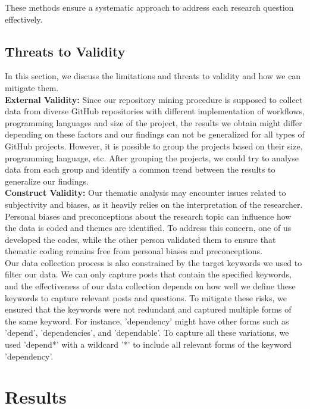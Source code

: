 \documentclass[conference]{IEEEtran}
\begin{document}
These methods ensure a systematic approach to address each research question effectively.\\


    \subsection{Threats to Validity}
        In this section, we discuss the limitations and threats to
        validity and how we can mitigate them.\\

        \textbf{External Validity:} Since our repository mining procedure is supposed to collect data from diverse GitHub repositories with different implementation of workflows, programming languages and size of the project, the results we obtain might differ depending on these factors and our findings can not be generalized for all types of GitHub projects. However, it is possible to group the projects based on their size, programming language, etc. After grouping the projects, we could try to analyse data from each group and identify a common trend between the results to generalize our findings.\\

	\textbf{Construct Validity:} Our thematic analysis may encounter issues related to subjectivity and biases, as it heavily relies on the interpretation of the researcher. Personal biases and preconceptions about the research topic can influence how the data is coded and themes are identified. To address this concern, one of us developed the codes, while the other person validated them to ensure that thematic coding remains free from personal biases and preconceptions.\\
Our data collection process is also constrained by the target keywords we used to filter our data. We can only capture posts that contain the specified keywords, and the effectiveness of our data collection depends on how well we define these keywords to capture relevant posts and questions. To mitigate these risks, we ensured that the keywords were not redundant and captured multiple forms of the same keyword. For instance, 'dependency' might have other forms such as 'depend', 'dependencies', and 'dependable'. To capture all these variations, we used 'depend*' with a wildcard '*' to include all relevant forms of the keyword 'dependency'.


\section{Results}
\end{document}
